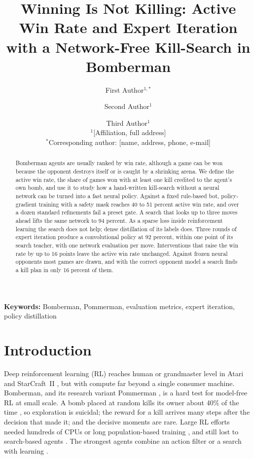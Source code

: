 \documentclass[11pt]{article}
\begin{document}
\title{Winning Is Not Killing: Active Win Rate and Expert Iteration with a Network-Free Kill-Search in Bomberman}

\author{First Author$^{1,*}$ \and Second Author$^{1}$ \and Third Author$^{1}$\\[4pt]
\small $^{1}$[Affiliation, full address]\\
\small $^{*}$Corresponding author: [name, address, phone, e-mail]}
\date{}

\maketitle

\begin{abstract}
Bomberman agents are usually ranked by win rate, although a game can be won because the opponent destroys itself or is caught by a shrinking arena. We define the active win rate, the share of games won with at least one kill credited to the agent's own bomb, and use it to study how a hand-written kill-search without a neural network can be turned into a fast neural policy. Against a fixed rule-based bot, policy-gradient training with a safety mask reaches 40 to 51 percent active win rate, and over a dozen standard refinements fail a preset gate. A search that looks up to three moves ahead lifts the same network to 94 percent. As a sparse loss inside reinforcement learning the search does not help; dense distillation of its labels does. Three rounds of expert iteration produce a convolutional policy at 92 percent, within one point of its search teacher, with one network evaluation per move. Interventions that raise the win rate by up to 16 points leave the active win rate unchanged. Against frozen neural opponents most games are drawn, and with the correct opponent model a search finds a kill plan in only 16 percent of them.
\end{abstract}

\noindent\textbf{Keywords:} Bomberman, Pommerman, evaluation metrics, expert iteration, policy distillation

\section{Introduction}

Deep reinforcement learning (RL) reaches human or grandmaster level in Atari and StarCraft~II \cite{mnih2015dqn,vinyals2019alphastar}, but with compute far beyond a single consumer machine. Bomberman, and its research variant Pommerman \cite{resnick2018pommerman}, is a hard test for model-free RL at small scale. A bomb placed at random kills its owner about 40\% of the time \cite{gao2019hard}, so exploration is suicidal; the reward for a kill arrives many steps after the decision that made it; and the decisive moments are rare. Large RL efforts needed hundreds of CPUs \cite{peng2018continual} or long population-based training \cite{huynh2024}, and still lost to search-based agents \cite{osogami2019,huynh2024}. The strongest agents combine an action filter or a search with learning \cite{gao2019skynet,osogami2019,weil2023}.
\end{document}
